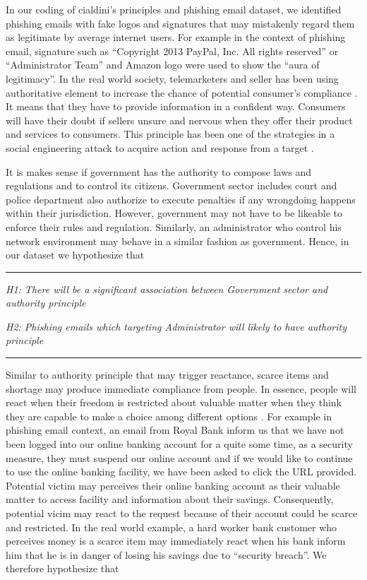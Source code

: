 In our coding of cialdini's principles and phishing email dataset,
we identified phishing emails with fake logos and signatures that
may mistakenly regard them as legitimate by average internet users.
For example in the context of phishing email, signature such as ``Copyright
2013 PayPal, Inc. All rights reserved'' or ``Administrator Team''
and Amazon logo were used to show the ``aura of legitimacy''. In
the real world society, telemarketers and seller has been using authoritative
element to increase the chance of potential consumer's compliance
\cite{telemarket:2013}. It means that they have to provide information
in a confident way. Consumers will have their doubt if sellers unsure
and nervous when they offer their product and services to consumers.
This principle has been one of the strategies in a social engineering
attack to acquire action and response from a target \cite{npdn:2013}.

It is makes sense if government has the authority to compose laws
and regulations and to control its citizens. Government sector includes
court and police department also authorize to execute penalties if
any wrongdoing happens within their jurisdiction. However, government
may not have to be likeable to enforce their rules and regulation.
Similarly, an administrator who control his network environment may
behave in a similar fashion as government. Hence, in our dataset we
hypothesize that

\rule[0.5ex]{1\columnwidth}{1pt}

\textit{H1: There will be a significant association between Government
sector and authority principle}

\textit{H2: Phishing emails which targeting Administrator will likely
to have authority principle }

\rule[0.5ex]{1\columnwidth}{1pt}

Similar to authority principle that may trigger reactance, scarce
items and shortage may produce immediate compliance from people. In
essence, people will react when their freedom is restricted about
valuable matter when they think they are capable to make a choice
among different options \cite{pennebaker1976american}. For example
in phishing email context, an email from Royal Bank inform us that
we have not been logged into our online banking account for a quite
some time, as a security measure, they must suspend our online account
and if we would like to continue to use the online banking facility,
we have been asked to click the URL provided. Potential victim may
perceives their online banking account as their valuable matter to
access facility and information about their savings. Consequently,
potential vicim may react to the request because of their account
could be scarce and restricted. In the real world example, a hard
worker bank customer who perceives money is a scarce item may immediately
react when his bank inform him that he is in danger of losing his
savings due to ``security breach''. We therefore hypothesize that

